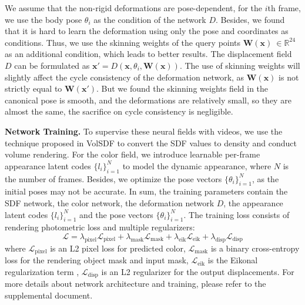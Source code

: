We assume that the non-rigid deformations are pose-dependent, for the $i$th frame, we use the body pose $\theta_i$ as the condition of the network $D$. 
Besides, we found that it is hard to learn the deformation using only the pose and coordinates as conditions.
Thus, we use the skinning weights of the query points $\mathbf{W}(\mathbf{x})\ \in \mathbb{R}^{24}$ as an additional condition, which leads to better results.
The displacement field $D$ can be formulated as $\mathbf{x}' = D(\mathbf{x}, \theta_i, \mathbf{W}(\mathbf{x}))$.
The use of skinning weights will slightly affect the cycle consistency of the deformation network, as $\mathbf{W}(\mathbf{x})$ is not strictly equal to $\mathbf{W}(\mathbf{x}')$.
But we found the skinning weights field in the canonical pose is smooth, and the deformations are relatively small, so they are almost the same, the sacrifice on cycle consistency is negligible.

\textbf{Network Training.}
To supervise these neural fields with videos, we use the technique proposed in VolSDF \cite{volsdf} to convert the SDF values to density and conduct volume rendering. 
For the color field, we introduce learnable per-frame appearance latent codes $\{l_i\}_{i=1}^N$ to model the dynamic appearance, where $N$ is the number of frames.
Besides, we optimize the pose vectors $\{\theta_i\}_{i=1}^N$, as the initial poses may not be accurate.
In sum, the training parameters contain the SDF network, the color network, the deformation network $D$, the appearance latent codes $\{l_i\}_{i=1}^N$ and the pose vectors $\{\theta_i\}_{i=1}^N$. 
The training loss consists of rendering photometric loss and multiple regularizers:
\begin{equation}
    \mathcal{L} = \lambda_{\text{pixel}}\mathcal{L}_{\text{pixel}} + \lambda_{\text{mask}}\mathcal{L}_{\text{mask}} + \lambda_{\text{eik}}\mathcal{L}_{{\text{eik}}} + \lambda_{\text{disp}}\mathcal{L}_{{\text{disp}}}
\end{equation}
where $\mathcal{L}_{\text{pixel}}$ is an L2 pixel loss for predicted color, $\mathcal{L}_{\text{mask}}$ is a binary cross-entropy loss for the rendering object mask and input mask, $\mathcal{L}_{{\text{eik}}}$ is the Eikonal regularization term \cite{eik}, $\mathcal{L}_{{\text{disp}}}$ is an L2 regularizer for the output displacements.
For more details about network architecture and training, please refer to the supplemental document.

